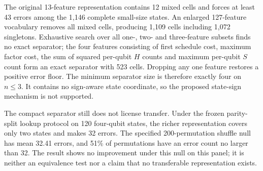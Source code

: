 The original 13-feature representation contains 12 mixed cells and forces at least 43 errors among the 1,146 complete small-size states.  An enlarged 127-feature vocabulary removes all mixed cells, producing 1,109 cells including 1,072 singletons.  Exhaustive search over all one-, two- and three-feature subsets finds no exact separator; the four features consisting of first schedule cost, maximum factor cost, the sum of squared per-qubit $H$ counts and maximum per-qubit $S$ count form an exact separator with 523 cells.  Dropping any one feature restores a positive error floor.  The minimum separator size is therefore exactly four on $n\le3$.  It contains no sign-aware state coordinate, so the proposed state-sign mechanism is not supported.

The compact separator still does not license transfer.  Under the frozen parity-split lookup protocol on 120 four-qubit states, the richer representation covers only two states and makes 32 errors.  The specified 200-permutation shuffle null has mean 32.41 errors, and 51\% of permutations have an error count no larger than 32.  The result shows no improvement under this null on this panel; it is neither an equivalence test nor a claim that no transferable representation exists.
